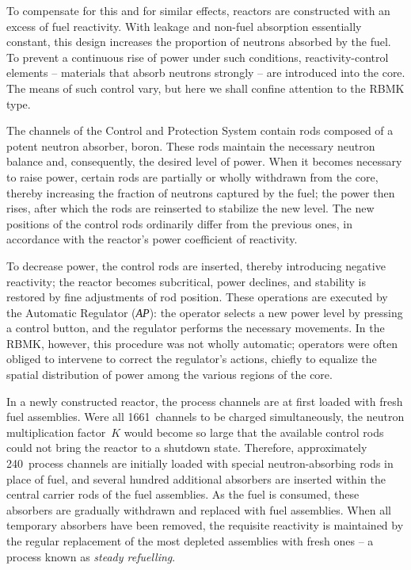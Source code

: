 \documentclass[openright]{bookest}
\begin{document}
To compensate for this and for similar effects, reactors are constructed with an excess of fuel reactivity. With leakage and non-fuel absorption essentially constant, this design increases the proportion of neutrons absorbed by the fuel. To prevent a continuous rise of power under such conditions, reactivity-control elements -- materials that absorb neutrons strongly -- are introduced into the core. The means of such control vary, but here we shall confine attention to the RBMK type.

The channels of the Control and Protection System contain rods composed of a potent neutron absorber, boron. These rods maintain the necessary neutron balance and, consequently, the desired level of power. When it becomes necessary to raise power, certain rods are partially or wholly withdrawn from the core, thereby increasing the fraction of neutrons captured by the fuel; the power then rises, after which the rods are reinserted to stabilize the new level. The new positions of the control rods ordinarily differ from the previous ones, in accordance with the reactor's power coefficient of reactivity.

To decrease power, the control rods are inserted, thereby introducing negative reactivity; the reactor becomes subcritical, power declines, and stability is restored by fine adjustments of rod position. These operations are executed by the Automatic Regulator (\textit{АР}): the operator selects a new power level by pressing a control button, and the regulator performs the necessary movements. In the RBMK, however, this procedure was not wholly automatic; operators were often obliged to intervene to correct the regulator's actions, chiefly to equalize the spatial distribution of power among the various regions of the core.

In a newly constructed reactor, the process channels are at first loaded with fresh fuel assemblies. Were all \num{1661}~channels to be charged simultaneously, the neutron multiplication factor~$K$ would become so large that the available control rods could not bring the reactor to a shutdown state. Therefore, approximately \num{240}~process channels are initially loaded with special neutron-absorbing rods in place of fuel, and several hundred additional absorbers are inserted within the central carrier rods of the fuel assemblies. As the fuel is consumed, these absorbers are gradually withdrawn and replaced with fuel assemblies. When all temporary absorbers have been removed, the requisite reactivity is maintained by the regular replacement of the most depleted assemblies with fresh ones -- a process known as \textit{steady refuelling}.
\end{document}
